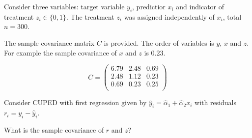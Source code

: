
\begin{question}
Consider three variables: target variable \(y_i\), predictior \(x_i\) and indicator of treatment \(z_i \in \{0,1\}\).
The treatment \(z_i\) was assigned independently of \(x_i\), total \(n=300\).

The sample covariance matrix \(C\) is provided.
The order of variables is \(y\), \(x\) and \(z\).
For example the sample covariance of \(x\) and \(z\) is 0.23.

\[
C = \begin{pmatrix}
        6.79 & 2.48 & 0.69 \\
        2.48 & 1.12 & 0.23 \\
        0.69 & 0.23 & 0.25 \\
\end{pmatrix}    
\]

Consider CUPED with first regression given by \(\hat y_i = \hat\alpha_1 + \hat\alpha_2 x_i\) with residuals \(r_i = y_i - \hat y_i\).

What is the sample covariance of \(r\) and \(z\)?
\end{question}


